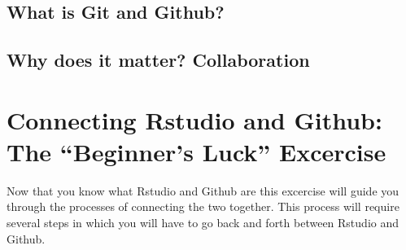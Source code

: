 \documentclass{article}\usepackage[]{graphicx}\usepackage[]{color}
\begin{document}
  
  
  \subsection{What is Git and Github?}
  
  \subsection{Why does it matter? Collaboration}
  
  
\section{Connecting Rstudio and Github: The ``Beginner's Luck'' Excercise}
Now that you know what Rstudio and Github are this excercise will guide you through the processes of connecting the two together. This process will require several steps in which you will have to go back and forth between Rstudio and Github. 
\end{document}
